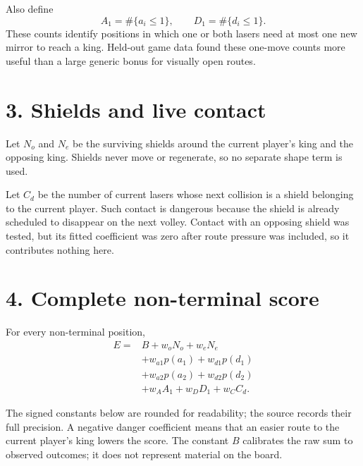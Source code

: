 \documentclass[11pt]{article}
\begin{document}
Also define
\[
A_1=\#\{a_i\leq 1\},
\qquad
D_1=\#\{d_i\leq 1\}.
\]
These counts identify positions in which one or both lasers need at most one new
mirror to reach a king. Held-out game data found these one-move counts more useful
than a large generic bonus for visually open routes.

\section*{3. Shields and live contact}

Let \(N_o\) and \(N_e\) be the surviving shields around the current player's
king and the opposing king. Shields never move or regenerate, so no separate
shape term is used.

Let \(C_d\) be the number of current lasers whose next collision is a shield
belonging to the current player. Such contact is dangerous because the shield is
already scheduled to disappear on the next volley. Contact with an opposing
shield was tested, but its fitted coefficient was zero after route pressure was
included, so it contributes nothing here.

\section*{4. Complete non-terminal score}

For every non-terminal position,
\[
\begin{aligned}
E={}&B+w_oN_o+w_eN_e\\
&+w_{a1}p(a_1)+w_{d1}p(d_1)\\
&+w_{a2}p(a_2)+w_{d2}p(d_2)\\
&+w_AA_1+w_DD_1+w_CC_d.
\end{aligned}
\]

The signed constants below are rounded for readability; the source records their
full precision. A negative danger coefficient means that an easier route to the
current player's king lowers the score. The constant \(B\) calibrates the raw sum to observed outcomes;
it does not represent material on the board.
\end{document}
